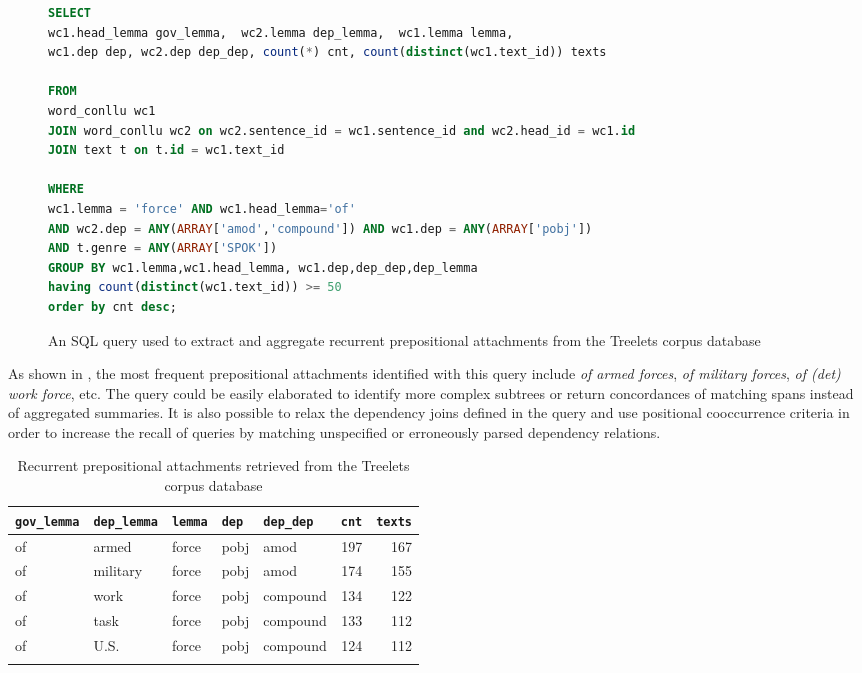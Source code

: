 \documentclass[output=paper]{langscibook}
\begin{document}
\begin{figure}
\begin{lstlisting}[language=SQL,frame=lines]
SELECT
wc1.head_lemma gov_lemma,  wc2.lemma dep_lemma,  wc1.lemma lemma, 
wc1.dep dep, wc2.dep dep_dep, count(*) cnt, count(distinct(wc1.text_id)) texts

FROM
word_conllu wc1
JOIN word_conllu wc2 on wc2.sentence_id = wc1.sentence_id and wc2.head_id = wc1.id
JOIN text t on t.id = wc1.text_id

WHERE
wc1.lemma = 'force' AND wc1.head_lemma='of'
AND wc2.dep = ANY(ARRAY['amod','compound']) AND wc1.dep = ANY(ARRAY['pobj'])
AND t.genre = ANY(ARRAY['SPOK'])
GROUP BY wc1.lemma,wc1.head_lemma, wc1.dep,dep_dep,dep_lemma
having count(distinct(wc1.text_id)) >= 50
order by cnt desc;
\end{lstlisting}
\caption{\label{fig:pezik:12}An SQL query used to extract and aggregate recurrent prepositional attachments from the Treelets corpus database}
\end{figure}

As shown in , the most frequent prepositional attachments identified with this query include \textit{of armed forces}, \textit{of military forces}, \textit{of (det) work force}, etc. The query could be easily elaborated to identify more complex subtrees or return concordances of matching spans instead of aggregated summaries. It is also possible to relax the dependency joins defined in the query and use positional cooccurrence criteria in order to increase the recall of queries by matching unspecified or erroneously parsed dependency relations.

\begin{table}
\begin{tabular}{lllllrr}
\lsptoprule
\texttt{gov\_lemma} & \texttt{dep\_lemma} & \texttt{lemma} & \texttt{dep} & \texttt{dep\_dep} & \texttt{cnt} & \texttt{texts}\\
\midrule
of & armed & force & pobj & amod &  197 &  167\\
of & military & force & pobj & amod &  174 &  155\\
of & work & force & pobj & compound &  134 &  122\\
of & task & force & pobj & compound &  133 &  112\\
of & U.S. & force & pobj & compound &  124 &  112\\
\lspbottomrule
\end{tabular}
\caption{\label{tab:pezik:13}Recurrent prepositional attachments retrieved from the Treelets corpus database}
\end{table}
\end{document}
